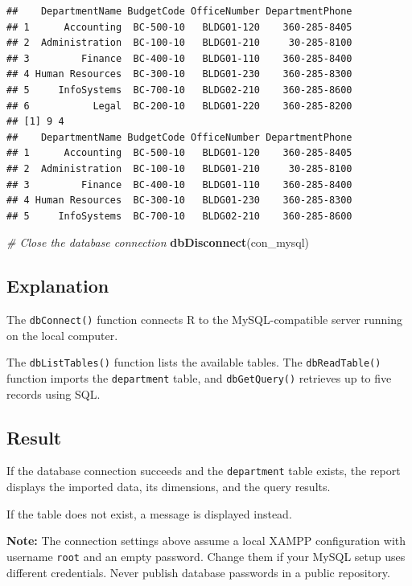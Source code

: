 \documentclass[
]{article}
\newenvironment{Shaded}{\begin{snugshade}}{\end{snugshade}}
\newcommand{\CommentTok}[1]{\textcolor[rgb]{0.56,0.35,0.01}{\textit{#1}}}
\newcommand{\FunctionTok}[1]{\textcolor[rgb]{0.13,0.29,0.53}{\textbf{#1}}}
\newcommand{\NormalTok}[1]{#1}
\begin{document}
\begin{verbatim}
##    DepartmentName BudgetCode OfficeNumber DepartmentPhone
## 1      Accounting  BC-500-10   BLDG01-120    360-285-8405
## 2  Administration  BC-100-10   BLDG01-210     30-285-8100
## 3         Finance  BC-400-10   BLDG01-110    360-285-8400
## 4 Human Resources  BC-300-10   BLDG01-230    360-285-8300
## 5     InfoSystems  BC-700-10   BLDG02-210    360-285-8600
## 6           Legal  BC-200-10   BLDG01-220    360-285-8200
## [1] 9 4
##    DepartmentName BudgetCode OfficeNumber DepartmentPhone
## 1      Accounting  BC-500-10   BLDG01-120    360-285-8405
## 2  Administration  BC-100-10   BLDG01-210     30-285-8100
## 3         Finance  BC-400-10   BLDG01-110    360-285-8400
## 4 Human Resources  BC-300-10   BLDG01-230    360-285-8300
## 5     InfoSystems  BC-700-10   BLDG02-210    360-285-8600
\end{verbatim}

\begin{Shaded}
\begin{Highlighting}[]
\CommentTok{\# Close the database connection}
\FunctionTok{dbDisconnect}\NormalTok{(con\_mysql)}
\end{Highlighting}
\end{Shaded}

\subsection{Explanation}\label{explanation-3}

The \texttt{dbConnect()} function connects R to the MySQL-compatible
server running on the local computer.

The \texttt{dbListTables()} function lists the available tables. The
\texttt{dbReadTable()} function imports the \texttt{department} table,
and \texttt{dbGetQuery()} retrieves up to five records using SQL.

\subsection{Result}\label{result-3}

If the database connection succeeds and the \texttt{department} table
exists, the report displays the imported data, its dimensions, and the
query results.

If the table does not exist, a message is displayed instead.

\textbf{Note:} The connection settings above assume a local XAMPP
configuration with username \texttt{root} and an empty password. Change
them if your MySQL setup uses different credentials. Never publish
database passwords in a public repository.
\end{document}
